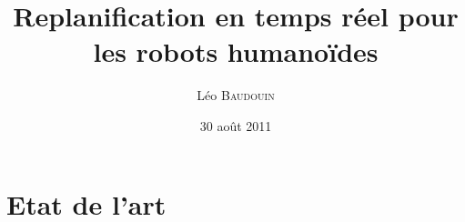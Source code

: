 \documentclass{beamer}
\title[Replanification rapide]{Replanification en temps réel pour\\ les robots humanoïdes}
\author{L\'eo B\textsc{audouin}}
\institute[LAAS-CNRS]
{
Stage de Master Recherche 2011\\
\medskip
{\emph{leo.baudouin@ifma.fr}}
}
\date{30 août 2011}
\begin{document}
\begin{frame}
\titlepage
\end{frame}

\begin{frame}
\tableofcontents
\end{frame}







\section{Etat de l'art}
\end{document}
